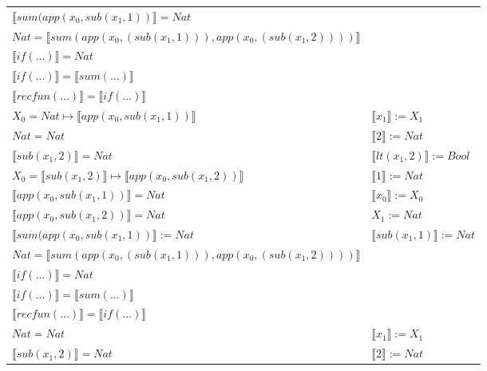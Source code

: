 \begin{exercise}
\begin{description}
\begin{center}
\begin{longtable}[!h]{ | l | l | }
                        $ \llbracket sum(app(x_0, sub(x_1,1)) \rrbracket = Nat$ & \\
                        $Nat =  \llbracket sum(app(x_0, (sub(x_1,1))), app(x_0, (sub(x_1,2)))) \rrbracket$ & \\
                        $ \llbracket if(...) \rrbracket = Nat$ & \\
                        $ \llbracket if(...) \rrbracket =  \llbracket sum(...) \rrbracket$ & \\
                        $ \llbracket recfun(...) \rrbracket =  \llbracket if(...) \rrbracket$ & \\
                    \hline
                        $X_0 = Nat \mapsto  \llbracket app(x_0, sub(x_1,1)) \rrbracket$ &   $ \llbracket x_1 \rrbracket := X_1$ \\
                        $Nat = Nat$ & $ \llbracket 2 \rrbracket := Nat$ \\
                        $ \llbracket sub(x_1,2) \rrbracket = Nat$ & $ \llbracket lt(x_1 , 2) \rrbracket := Bool$ \\
                        $X_0 =  \llbracket sub(x_1,2) \rrbracket \mapsto  \llbracket app(x_0, sub(x_1,2)) \rrbracket$ &  $ \llbracket 1 \rrbracket := Nat$ \\
                        $ \llbracket app(x_0, sub(x_1,1)) \rrbracket = Nat$ & $ \llbracket x_0 \rrbracket := X_0$ \\
                        $ \llbracket app(x_0, sub(x_1,2)) \rrbracket = Nat$ & $X_1 := Nat$ \\
                        $ \llbracket sum(app(x_0, sub(x_1,1)) \rrbracket := Nat$ & $ \llbracket sub(x_1,1) \rrbracket := Nat$ \\
                        $Nat =  \llbracket sum(app(x_0, (sub(x_1,1))), app(x_0, (sub(x_1,2)))) \rrbracket$ & \\
                        $ \llbracket if(...) \rrbracket = Nat$ & \\
                        $ \llbracket if(...) \rrbracket =  \llbracket sum(...) \rrbracket$ & \\
                        $ \llbracket recfun(...) \rrbracket =  \llbracket if(...) \rrbracket$ & \\
                    \hline
                        $Nat = Nat$ &  $ \llbracket x_1 \rrbracket := X_1$ \\
                        $ \llbracket sub(x_1,2) \rrbracket = Nat$ & $ \llbracket 2 \rrbracket := Nat$  \\

\end{longtable}
\end{center}
\end{description}
\end{exercise}
